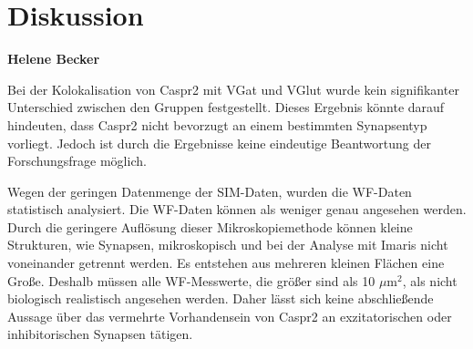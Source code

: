 \chapter{Diskussion}
\textbf{Helene Becker}

Bei der Kolokalisation von Caspr2 mit VGat und VGlut wurde kein signifikanter Unterschied zwischen den Gruppen festgestellt. Dieses Ergebnis könnte darauf hindeuten, dass Caspr2 nicht bevorzugt an einem bestimmten Synapsentyp vorliegt.
Jedoch ist durch die Ergebnisse keine eindeutige Beantwortung der Forschungsfrage möglich.

Wegen der geringen Datenmenge der SIM-Daten, wurden die WF-Daten statistisch analysiert. Die WF-Daten können als weniger genau angesehen werden. Durch die geringere Auflösung dieser Mikroskopiemethode können kleine Strukturen, wie Synapsen, mikroskopisch und bei der Analyse mit Imaris nicht voneinander getrennt werden. Es entstehen aus mehreren kleinen Flächen eine Große. Deshalb müssen alle WF-Messwerte, die größer sind als 10 $\mu\text{m}^2$, als nicht biologisch realistisch angesehen werden. Daher lässt sich keine abschließende Aussage über das vermehrte Vorhandensein von Caspr2 an exzitatorischen oder inhibitorischen Synapsen tätigen.
 

